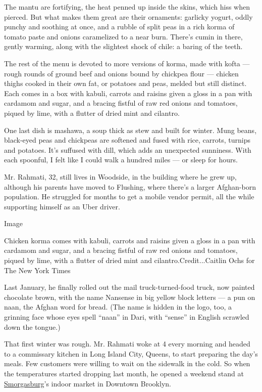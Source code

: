 The mantu are fortifying, the heat penned up inside the skins, which
hiss when pierced. But what makes them great are their ornaments:
garlicky yogurt, oddly punchy and soothing at once, and a rubble of
split peas in a rich korma of tomato paste and onions caramelized to a
near burn. There's cumin in there, gently warming, along with the
slightest shock of chile: a baring of the teeth.

The rest of the menu is devoted to more versions of korma, made with
kofta --- rough rounds of ground beef and onions bound by chickpea flour
--- chicken thighs cooked in their own fat, or potatoes and peas, melded
but still distinct. Each comes in a box with kabuli, carrots and raisins
given a gloss in a pan with cardamom and sugar, and a bracing fistful of
raw red onions and tomatoes, piqued by lime, with a flutter of dried
mint and cilantro.

One last dish is mashawa, a soup thick as stew and built for winter.
Mung beans, black-eyed peas and chickpeas are softened and fused with
rice, carrots, turnips and potatoes. It's suffused with dill, which adds
an unexpected sunniness. With each spoonful, I felt like I could walk a
hundred miles --- or sleep for hours.

Mr. Rahmati, 32, still lives in Woodside, in the building where he grew
up, although his parents have moved to Flushing, where there's a larger
Afghan-born population. He struggled for months to get a mobile vendor
permit, all the while supporting himself as an Uber driver.

Image

Chicken korma comes with kabuli, carrots and raisins given a gloss in a
pan with cardamom and sugar, and a bracing fistful of raw red onions and
tomatoes, piqued by lime, with a flutter of dried mint and
cilantro.Credit...Caitlin Ochs for The New York Times

Last January, he finally rolled out the mail truck-turned-food truck,
now painted chocolate brown, with the name Nansense in big yellow block
letters --- a pun on naan, the Afghan word for bread. (The name is
hidden in the logo, too, a grinning face whose eyes spell ``naan'' in
Dari, with ``sense'' in English scrawled down the tongue.)

That first winter was rough. Mr. Rahmati woke at 4 every morning and
headed to a commissary kitchen in Long Island City, Queens, to start
preparing the day's meals. Few customers were willing to wait on the
sidewalk in the cold. So when the temperatures started dropping last
month, he opened a weekend stand at
\href{https://www.smorgasburg.com/}{Smorgasburg}'s indoor market in
Downtown Brooklyn.

